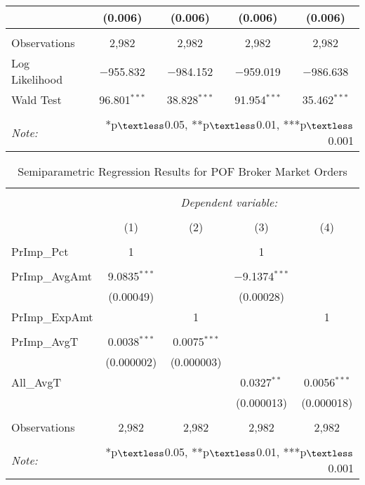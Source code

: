 \documentclass[11pt,a4paper]{article}
\begin{document}
\begin{table}[!htbp]
\begin{tabular}{@{\extracolsep{1em}}lcccc}
		& (0.006) & (0.006) & (0.006) & (0.006) \\  [0.5ex]
		\hline \\[-1.8ex]  
		Observations & 2,982 & 2,982 & 2,982 & 2,982 \\  
		Log Likelihood & $-$955.832 & $-$984.152 & $-$959.019 & $-$986.638 \\  
		Wald Test & 96.801$^{***}$ & 38.828$^{***}$ & 91.954$^{***}$ & 35.462$^{***}$ \\  
		\hline  
		\hline \\[-1.8ex]  
		\textit{Note:}  & \multicolumn{4}{r}{*p$\textless$0.05, **p$\textless$0.01, ***p$\textless$0.001} \\  
	\end{tabular} 
\end{table} 


\begin{table}[!htbp] 
	\captionsetup{font=normal}
	\caption{Semiparametric Regression Results for POF Broker Market Orders} 
	\label{} 
	\centering
	\small
	\begin{tabular}{@{\extracolsep{1em}}lcccc} 
		\\[-1.8ex]\hline  
		\hline \\[-1.8ex]  
		& \multicolumn{4}{c}{\textit{Dependent variable:}} \\  
		\cline{2-5}  
		\\[-1.8ex] & (1) & (2) & (3) & (4)\\  
		\hline \\[-1.8ex]  
		PrImp\_Pct & 1 &  & 1 &  \\  
		&  &  &  &  \\  [1.5ex]
		PrImp\_AvgAmt & 9.0835$^{***}$ &  & $-$9.1374$^{***}$ &  \\  
		& (0.00049) &  & (0.00028) &  \\  [1.5ex]
		PrImp\_ExpAmt &  &1 &  & 1 \\  
		&  &  &  &  \\ [1.5ex]
		PrImp\_AvgT & 0.0038$^{***}$ & 0.0075$^{***}$ &  &  \\  
		& (0.000002) & (0.000003) &  &  \\  [1.5ex]
		All\_AvgT &  &  & 0.0327$^{**}$ & 0.0056$^{***}$ \\  
		&  &  & (0.000013) & (0.000018) \\  [1.5ex]
		\hline \\[-1.8ex]  
		Observations & 2,982 & 2,982 & 2,982 & 2,982 \\  
		\hline  
		\hline \\[-1.8ex]  
		\textit{Note:}  & \multicolumn{4}{r}{*p$\textless$0.05, **p$\textless$0.01, ***p$\textless$0.001} \\  
	\end{tabular} 
\end{table} 
\end{document}
